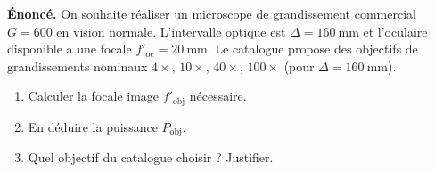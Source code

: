 \documentclass[11pt]{article}
\begin{document}
\begin{exemplebox}
\textbf{Énoncé.} On souhaite réaliser un microscope de grandissement commercial $G = 600$ en vision normale. L'intervalle optique est $\Delta = 160\ \text{mm}$ et l'oculaire disponible a une focale $f'_{\text{oc}} = 20\ \text{mm}$. Le catalogue propose des objectifs de grandissements nominaux $4\times$, $10\times$, $40\times$, $100\times$ (pour $\Delta = 160\ \text{mm}$).
\begin{enumerate}
    \item Calculer la focale image $f'_{\text{obj}}$ nécessaire.
    \item En déduire la puissance $P_{\text{obj}}$.
    \item Quel objectif du catalogue choisir ? Justifier.
\end{enumerate}
\end{exemplebox}
\end{document}
